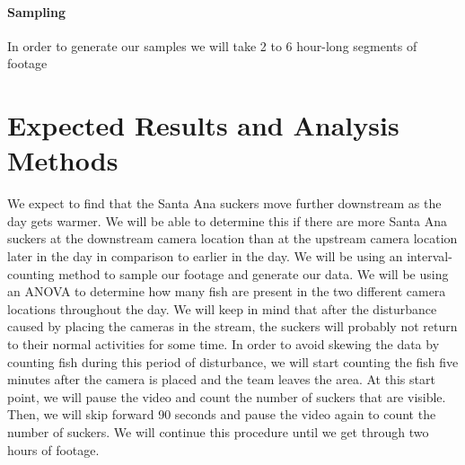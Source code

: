 \documentclass{tufte-handout}
\begin{document}
\paragraph{Sampling}
In order to generate our samples we will take 2 to 6 hour-long segments of footage 

\section{Expected Results and Analysis Methods}
We expect to find that the Santa Ana suckers move further downstream as the day gets warmer. We will be able to determine this if there are more Santa Ana suckers at the downstream camera location than at the upstream camera location later in the day in comparison to earlier in the day.
We will be using an interval-counting method to sample our footage and generate our data. We will be using an ANOVA to determine how many fish are present in the two different camera locations throughout the day. We will keep in mind that after the disturbance caused by placing the cameras in the stream, the suckers will probably not return to their normal activities for some time. In order to avoid skewing the data by counting fish during this period of disturbance, we will start counting the fish five minutes after the camera is placed and the team leaves the area. At this start point, we will pause the video and count the number of suckers that are visible. Then, we will skip forward 90 seconds and pause the video again to count the number of suckers. We will continue this procedure until we get through two hours of footage. 
\end{document}
